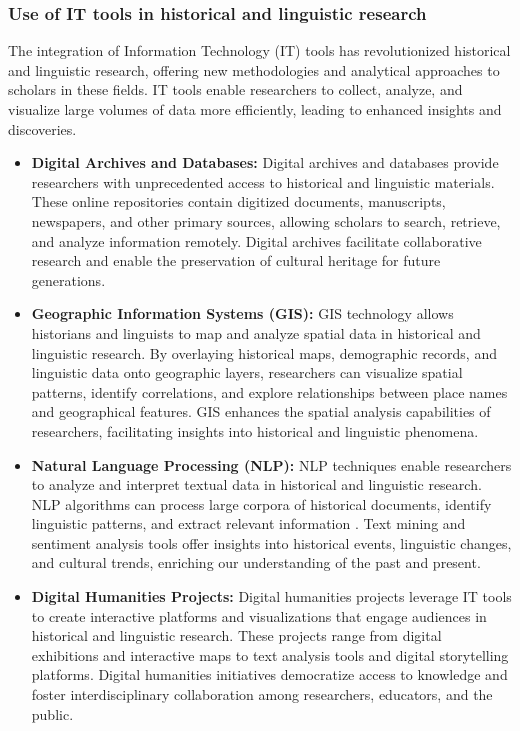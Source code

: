 \subsubsection{Use of IT tools in historical and linguistic research}
The integration of Information Technology (IT) tools has revolutionized historical and linguistic research, offering new methodologies and analytical approaches to scholars in these fields. IT tools enable researchers to collect, analyze, and visualize large volumes of data more efficiently, leading to enhanced insights and discoveries.
\begin{itemize}
    \item \textbf{Digital Archives and Databases:}
    Digital archives and databases provide researchers with unprecedented access to historical and linguistic materials. These online repositories contain digitized documents, manuscripts, newspapers, and other primary sources, allowing scholars to search, retrieve, and analyze information remotely. Digital archives facilitate collaborative research and enable the preservation of cultural heritage for future generations.
		\item \textbf{Geographic Information Systems (GIS):}
		GIS technology allows historians and linguists to map and analyze spatial data in historical and linguistic research. By overlaying historical maps, demographic records, and linguistic data onto geographic layers, researchers can visualize spatial patterns, identify correlations, and explore relationships between place names and geographical features\cite{Bolstad}. GIS enhances the spatial analysis capabilities of researchers, facilitating insights into historical and linguistic phenomena.
		\item \textbf{Natural Language Processing (NLP):}
		NLP techniques enable researchers to analyze and interpret textual data in historical and linguistic research. NLP algorithms can process large corpora of historical documents, identify linguistic patterns, and extract relevant information \cite{Bird}. Text mining and sentiment analysis tools offer insights into historical events, linguistic changes, and cultural trends, enriching our understanding of the past and present.
		\item \textbf{Digital Humanities Projects:}
		Digital humanities projects leverage IT tools to create interactive platforms and visualizations that engage audiences in historical and linguistic research. These projects range from digital exhibitions and interactive maps to text analysis tools and digital storytelling platforms\cite{Bolstad}. Digital humanities initiatives democratize access to knowledge and foster interdisciplinary collaboration among researchers, educators, and the public.

\end{itemize}
